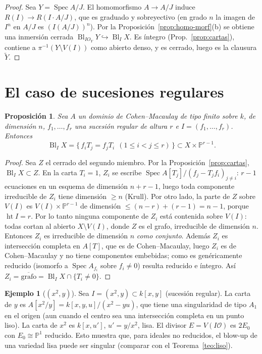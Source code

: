 \documentclass[11pt,a4paper,oneside]{book}
\newcommand{\Spec}{\operatorname{Spec}}
\newcommand{\Bl}{\operatorname{Bl}}
\newcommand{\PP}{\mathbb{P}}
\newcommand{\cO}{\mathcal{O}}
\theoremstyle{plain}
\newtheorem{proposicion}[teorema]{Proposición}
\theoremstyle{definition}
\newtheorem{ejemplo}[teorema]{Ejemplo}
\theoremstyle{remark}
\begin{document}
\begin{proof}
Sea $Y=\Spec A/J$. El homomorfismo $A\to A/J$ induce $R(I)\to R(I\cdot A/J)$, que es graduado y sobreyectivo (en grado $n$ la imagen de $I^n$ en $A/J$ es $(I(A/J))^n$). Por la Proposición~\ref{prop:homo-morf}(b) se obtiene una inmersión cerrada $\Bl_{IO_Y}Y\hookrightarrow\Bl_IX$. Es íntegro (Prop.~\ref{prop:cartas}), contiene a $\pi^{-1}(Y\setminus V(I))$ como abierto denso, y es cerrado, luego es la clausura $\tilde Y$.
\end{proof}

\section{El caso de sucesiones regulares}

\begin{proposicion}\label{prop:koszul}
Sea $A$ un dominio de Cohen--Macaulay de tipo finito sobre $k$, de dimensión $n$, $f_1,\dots,f_r$ una sucesión regular de altura $r$ e $I=(f_1,\dots,f_r)$. Entonces
\[
\Bl_IX=\{\,f_iT_j=f_jT_i\ \ (1\le i<j\le r)\,\}\subset X\times\PP^{r-1}.
\]
\end{proposicion}

\begin{proof}
Sea $Z$ el cerrado del segundo miembro. Por la Proposición~\ref{prop:cartas}, $\Bl_IX\subset Z$. En la carta $T_i=1$, $Z_i$ se escribe $\Spec A[T_j]/(f_j-T_jf_i)_{j\ne i}$: $r-1$ ecuaciones en un esquema de dimensión $n+r-1$, luego toda componente irreducible de $Z_i$ tiene dimensión $\ge n$ (Krull). Por otro lado, la parte de $Z$ sobre $V(I)$ es $V(I)\times\PP^{r-1}$ de dimensión $\le(n-r)+(r-1)=n-1$, porque $\operatorname{ht}I=r$. Por lo tanto ninguna componente de $Z_i$ está contenida sobre $V(I)$: todas cortan al abierto $X\setminus V(I)$, donde $Z$ es el grafo, irreducible de dimensión $n$. Entonces $Z_i$ es irreducible de dimensión $n$ \emph{como conjunto}. Además $Z_i$ es intersección completa en $A[T]$, que es de Cohen--Macaulay, luego $Z_i$ es de Cohen--Macaulay y no tiene componentes embebidas; como es genéricamente reducido (isomorfo a $\Spec A_{f_i}$ sobre $f_i\ne0$) resulta reducido e íntegro. Así $Z_i=\overline{\text{grafo}}=\Bl_IX\cap\{T_i\ne0\}$.
\end{proof}

\begin{ejemplo}[$(x^2,y)$]\label{ej:x2y}
Sea $I=(x^2,y)\subset k[x,y]$ (sucesión regular). La carta de $y$ es $A[x^2/y]=k[x,y,u]/(x^2-yu)$, que tiene una singularidad de tipo $A_1$ en el origen (aun cuando el centro sea una intersección completa en un punto liso). La carta de $x^2$ es $k[x,u']$, $u'=y/x^2$, lisa. El divisor $E=V(I\cO)$ es $2E_0$ con $E_0\cong\PP^1$ reducido. Esto muestra que, para ideales no reducidos, el blow-up de una variedad lisa puede ser singular (comparar con el Teorema~\ref{teo:liso}).
\end{ejemplo}
\end{document}
